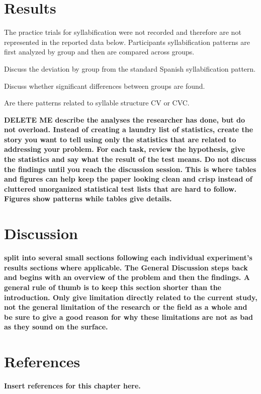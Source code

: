 \section{Results}

The practice trials for syllabification were not recorded and therefore are not represented in the reported data below. Participants syllabification patterns are first analyzed by group and then are compared across groups. 

Discuss the deviation by group from the standard Spanish syllabification pattern.

Discuss whether significant differences between groups are found.

Are there patterns related to syllable structure CV or CVC.

\textbf{DELETE ME describe the analyses the researcher has done, but do not overload. Instead of creating a laundry list of statistics, create the story you want to tell using only the statistics that are related to addressing your problem. 
For each task, review the hypothesis, give the statistics and say what the result of the test means. 
Do not discuss the findings until you reach the discussion session. 
This is where tables and figures can help keep the paper looking clean and crisp instead of cluttered unorganized statistical test lists that are hard to follow. 
Figures show patterns while tables give details.}


\section{Discussion}

\textbf{split into several small sections following each individual experiment’s results sections where applicable. 
The General Discussion steps back and begins with an overview of the problem and then the findings. A general rule of thumb is to keep this section shorter than the introduction. Only give limitation directly related to the current study, not the general limitation of the research or the field as a whole and be sure to give a good reason for why these limitations are not as bad as they sound on the surface.}



\section{References}

\textbf{Insert references for this chapter here.}









